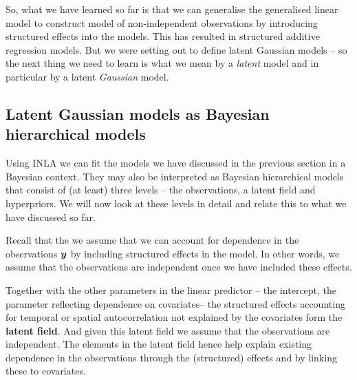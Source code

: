 So, what we have learned so far is that we can generalise the generalised linear model to construct model of non-independent observations by introducing  structured effects into the models. This has resulted in structured additive regression models. But we were setting out to define latent Gaussian models -- so the next thing we need to learn is what we mean by a \textit{latent} model and in particular by a latent \textit{Gaussian} model. 



\subsection{Latent Gaussian models  as Bayesian hierarchical models}
Using INLA we can fit the models we have discussed in the previous section in a Bayesian context.  They may also be interpreted as Bayesian hierarchical models that consist of (at least) three levels  -- the observations, a latent field and hyperpriors. We will now look at these levels in detail and relate this to what we have discussed so far.


Recall that the we assume that we can account for dependence in the observations $\boldsymbol{y}$ by including structured effects in the model. In other words,  we assume that the observations are independent once we have included these effects. 

Together with the other parameters in the linear predictor  -- the intercept, the parameter reflecting dependence on covariates--  the structured effects accounting for temporal or spatial autocorrelation not explained by the covariates form the \textbf{latent field}.  And given this latent field we assume that the observations are independent. The elements in the latent field hence help explain existing dependence in the observations through the (structured) effects and by linking these to covariates.

